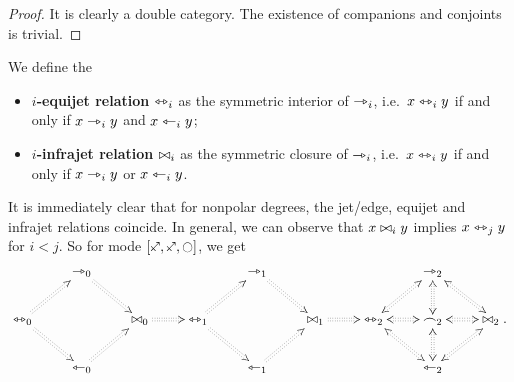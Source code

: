 \documentclass[a4paper]{article}
\begin{document}
\begin{proof}
	It is clearly a double category. The existence of companions and conjoints is trivial.
\end{proof}
\begin{definition}
	We define the
	\begin{itemize}
		\item \textbf{$i$-equijet relation} $\leftrightarrowtriangle_i$ as the symmetric interior of $\rightarrowtriangle_i$, i.e.\ $x \leftrightarrowtriangle_i y$ if and only if $x \rightarrowtriangle_i y$ and $x \leftarrowtriangle_i y$;
		\item \textbf{$i$-infrajet relation} $\mathrel{\bowtie}_i$ as the symmetric closure of $\rightarrowtriangle_i$, i.e.\ $x \leftrightarrowtriangle_i y$ if and only if $x \rightarrowtriangle_i y$ or $x \leftarrowtriangle_i y$.
	\end{itemize}
\end{definition}
It is immediately clear that for nonpolar degrees, the jet/edge, equijet and infrajet relations coincide.
In general, we can observe that $x \mathrel{\bowtie}_i y$ implies $x \leftrightarrowtriangle_j y$ for $i < j$.
So for mode $[\ypolar, \ypolar, \npolar]$, we get
\[
\xymatrix{
	& 
	\jet_0
		\ar@{:>}[rd]
	&&& 
	\jet_1 
		\ar@{:>}[rd]
	&&& 
	\jet_2 
		\ar@{<:>}[rd]
	\\
	\equijet_0
		\ar@{:>}[ru]
		\ar@{:>}[rd]
	&&
	\infrajet_0
		\ar@{:>}[r]
	&
	\equijet_1
		\ar@{:>}[ru]
		\ar@{:>}[rd]
	&&
	\infrajet_1
		\ar@{:>}[r]
	&
	\equijet_2
		\ar@{<:>}[ru]
		\ar@{<:>}[rd]
	&
	\edge_2
		\ar@{<:>}[l]
		\ar@{<:>}[u]
		\ar@{<:>}[r]
		\ar@{<:>}[d]
	&
	\infrajet_2.
	\\
	& 
	\tej_0 
		\ar@{:>}[ru]
	&&& 
	\tej_1 
		\ar@{:>}[ru]
	&&& 
	\tej_2 
		\ar@{<:>}[ru]
}
\]
\end{document}
